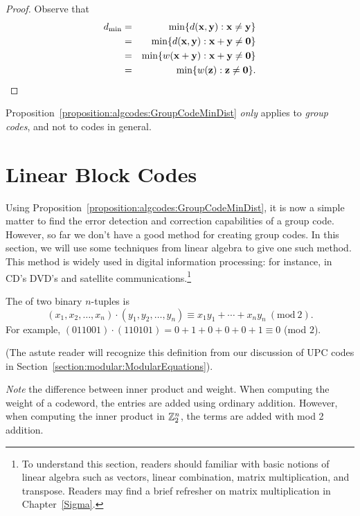 \begin{proof}
Observe that
\begin{eqnarray*}
d_{\min} &= & \min \{ d({\bold x},{\bold y}) : {\bold x}
\neq
{\bold y} \} \\
&= & \min \{ d({\bold x},{\bold y}) : {\bold x}+{\bold y}
\neq {\bold 0} \} \\
&=& \min\{ w({\bold x} + {\bold y}) : {\bold x}+{\bold y}
\neq {\bold 0} \} \\
& = & \min\{ w({\bold z}) : {\bold z} \neq {\bold 0} \}.
\end{eqnarray*}
\end{proof}
 
 \begin{warn}
 Proposition~\ref{proposition:algcodes:GroupCodeMinDist}  \emph{only} applies to \emph{group codes}, and not to codes in general.
 \end{warn}
 
\section{Linear Block Codes}
  
Using Proposition~\ref{proposition:algcodes:GroupCodeMinDist}, it is now a simple matter to find the error detection and correction capabilities of a group code. However, so far we don't have a good method  for creating group codes. In this section, we will use some techniques from linear algebra to give one such method. This method is widely used in digital information processing: for instance, in CD's DVD's and satellite communications.\footnote{To understand this section, readers should familiar with basic notions of linear algebra such as vectors, linear combination, matrix multiplication, and transpose. Readers may find a brief refresher on matrix multiplication in Chapter~\ref{Sigma}.}
 
 \begin{defn}
The  of two binary
$n$-tuples is
\[
(x_1, x_2, \ldots, x_n) \cdot (y_1, y_2, \ldots, y_n) \equiv x_1 y_1 + \cdots + x_n y_n ~(\mathrm{mod~}2).
\]
For example, $(011001) \cdot (110101) = 0+1+0+0+0+1 \equiv 0$ (mod $2$). 

\noindent
(The astute reader will recognize this definition from our discussion of UPC codes in Section~\ref{section:modular:ModularEquations}).
\end{defn}
\emph{Note} the difference between inner product and weight. When computing the weight of a codeword, the entries are added using ordinary addition. However, when computing the inner product  in ${\Bbb Z_2^n}$, the terms are added  with mod 2 addition.

